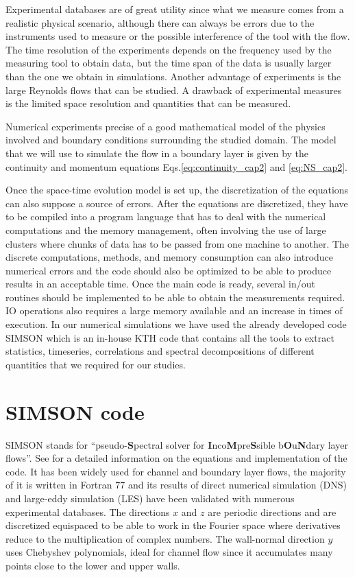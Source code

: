 Experimental databases are of great utility since what we measure comes from a realistic physical scenario, although there can always be errors due to the instruments used to measure or the possible interference of the tool with the flow.
The time resolution of the experiments depends on the frequency used by the measuring tool to obtain data, but the time span of the data is usually larger than the one we obtain in simulations.
Another advantage of experiments is the large Reynolds flows that can be studied.
A drawback of experimental measures is the limited space resolution and quantities that can be measured.

Numerical experiments precise of a good mathematical model of the physics involved and boundary conditions surrounding the studied domain. The model that we will use to simulate the flow in a boundary layer is given by the continuity and momentum equations Eqs.\ref{eq:continuity_cap2} and \ref{eq:NS_cap2}.

Once the space-time evolution model is set up, the discretization of the equations can also suppose a source of errors. After the equations are discretized, they have to be compiled into a program language that has to deal with the numerical computations and the memory management, often involving the use of large clusters where chunks of data has to be passed from one machine to another. The discrete computations, methods, and memory consumption can also introduce numerical errors and the code should also be optimized to be able to produce results in an acceptable time.
Once the main code is ready, several in/out routines should be implemented to be able to obtain the measurements required. IO operations also requires a large memory available and an increase in times of execution.
In our numerical simulations we have used the already developed code SIMSON which is an in-house KTH code that contains all the tools to extract statistics, timeseries, correlations and spectral decompositions of different quantities that we required for our studies.

\section{SIMSON code}
SIMSON stands for ``pseudo-\textbf{S}pectral solver for
\textbf{I}nco\textbf{M}pre\textbf{S}sible b\textbf{O}u\textbf{N}dary layer flows''. See \cite{simson_techrep} for a detailed information on the equations and implementation of the code.
It has been widely used for channel and boundary layer flows, the majority of it is written in Fortran 77 and its results of direct numerical simulation (DNS) and large-eddy simulation (LES) have been validated with numerous experimental databases.
The directions $x$ and $z$ are periodic directions and are discretized equispaced to be able to work in the Fourier space where derivatives reduce to the multiplication of complex numbers.
The wall-normal direction $y$ uses Chebyshev polynomials, ideal for channel flow since it accumulates many points close to the lower and upper walls. 


